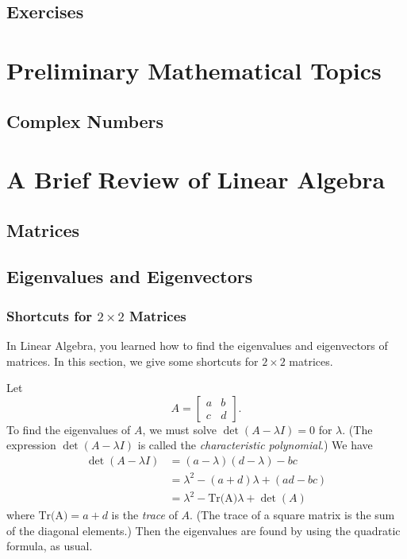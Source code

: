 \documentclass{book}
\begin{document}
\section{Exercises}
%
\appendix
%
\chapter{Preliminary Mathematical Topics}
\section{Complex Numbers}
%
\chapter{A Brief Review of Linear Algebra}
\section{Matrices}
\section{Eigenvalues and Eigenvectors}
\subsection{Shortcuts for $2\times 2$ Matrices}
In Linear Algebra, you learned how to find the eigenvalues
and eigenvectors of matrices.  In this section, we give
some shortcuts for $2\times 2$ matrices.

Let
\[
   A = \begin{bmatrix}
              a & b \\ c & d
       \end{bmatrix}.
\]
To find the eigenvalues of $A$, we must solve
$\det(A-\lambda I)=0$ for $\lambda$.
(The expression $\det(A-\lambda I)$ is called
the \emph{characteristic polynomial}.)  We have
\[
\begin{split}
   \det(A-\lambda I) & = (a-\lambda)(d-\lambda)-bc \\
                     & = \lambda^2-(a+d)\lambda + (ad-bc) \\
		     & = \lambda^2 - \textrm{Tr(A)}\lambda + \det(A)
\end{split}
\]
where $\textrm{Tr(A)} = a+d$ is the \emph{trace} of $A$.
(The trace of a square matrix is the sum of the diagonal elements.)
Then the eigenvalues are found by using the quadratic
formula, as usual.
\end{document}
